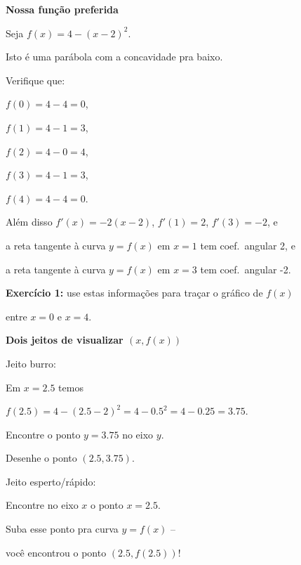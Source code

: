 \documentclass[oneside,12pt]{article}
\begin{document}
\newpage


{\bf Nossa função preferida}

Seja $f(x) = 4 - (x-2)^2$.

Isto é uma parábola com a concavidade pra baixo.

Verifique que:

$f(0)=4-4=0$,

$f(1)=4-1=3$,

$f(2)=4-0=4$,

$f(3)=4-1=3$,

$f(4)=4-4=0$.

\msk

Além disso $f'(x) = -2(x-2)$, $f'(1)=2$, $f'(3)=-2$, e

a reta tangente à curva $y=f(x)$ em $x=1$ tem coef.\ angular 2, e

a reta tangente à curva $y=f(x)$ em $x=3$ tem coef.\ angular -2.

\msk

{\bf Exercício 1:} use estas informações para traçar o gráfico de $f(x)$

entre $x=0$ e $x=4$.


\newpage


{\bf Dois jeitos de visualizar $(x,f(x))$}

Jeito burro:

Em $x=2.5$ temos

$f(2.5) = 4 - (2.5-2)^2 = 4 - 0.5^2 = 4-0.25 = 3.75$.

Encontre o ponto $y=3.75$ no eixo $y$.

Desenhe o ponto $(2.5,3.75)$.

\msk

Jeito esperto/rápido:

Encontre no eixo $x$ o ponto $x=2.5$.

Suba esse ponto pra curva $y=f(x)$ --

você encontrou o ponto $(2.5,f(2.5))$!


\newpage

\end{document}
